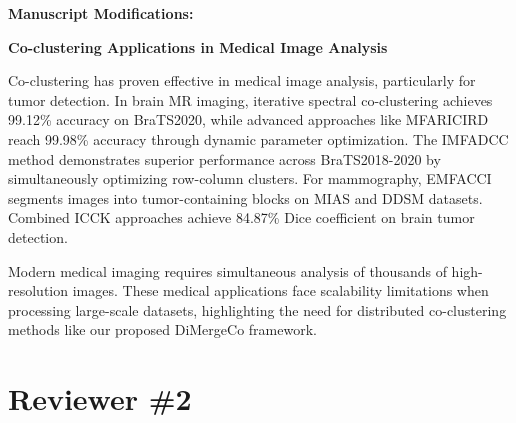 \documentclass{ar2rc}
\begin{document}
\textbf{Manuscript Modifications:}

\textbf{Co-clustering Applications in Medical Image Analysis}

Co-clustering has proven effective in medical image analysis, particularly for tumor detection. In brain MR imaging, iterative spectral co-clustering achieves 99.12\% accuracy on BraTS2020\cite{farnoosh2024DevelopmentUnsupervisedPseudodeep}, while advanced approaches like MFARICIRD reach 99.98\% accuracy through dynamic parameter optimization\cite{farnoosh2025PseudodeepUnsupervisedModelbased}. The IMFADCC method demonstrates superior performance across BraTS2018-2020 by simultaneously optimizing row-column clusters\cite{farnoosh2024BrainMagneticResonance}. For mammography, EMFACCI segments images into tumor-containing blocks on MIAS and DDSM datasets\cite{farnoosh2024NovelApproachAutomatic}. Combined ICCK approaches achieve 84.87\% Dice coefficient on brain tumor detection\cite{farnoosh2022ApplicationModifiedCombinational}.

Modern medical imaging requires simultaneous analysis of thousands of high-resolution images. These medical applications face scalability limitations when processing large-scale datasets, highlighting the need for distributed co-clustering methods like our proposed DiMergeCo framework.


\section{Reviewer \#2}


\end{document}
